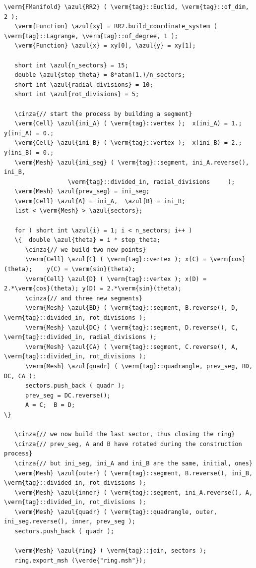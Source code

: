 \begin{Verbatim}[commandchars=\\\{\},formatcom=\small\tt,frame=single,
   label=parag-\ref{\numb section 9.\numb parag 2}.cpp,rulecolor=\color{coment},
   baselinestretch=0.94,framesep=2mm                                            ]
   \verm{FManifold} \azul{RR2} ( \verm{tag}::Euclid, \verm{tag}::of_dim, 2 );
   \verm{Function} \azul{xy} = RR2.build_coordinate_system ( \verm{tag}::Lagrange, \verm{tag}::of_degree, 1 );
   \verm{Function} \azul{x} = xy[0], \azul{y} = xy[1];

   short int \azul{n_sectors} = 15;
   double \azul{step_theta} = 8*atan(1.)/n_sectors;
   short int \azul{radial_divisions} = 10;
   short int \azul{rot_divisions} = 5;

   \cinza{// start the process by building a segment}
   \verm{Cell} \azul{ini_A} ( \verm{tag}::vertex );  x(ini_A) = 1.;  y(ini_A) = 0.;
   \verm{Cell} \azul{ini_B} ( \verm{tag}::vertex );  x(ini_B) = 2.;  y(ini_B) = 0.;
   \verm{Mesh} \azul{ini_seg} ( \verm{tag}::segment, ini_A.reverse(), ini_B,
                  \verm{tag}::divided_in, radial_divisions     );
   \verm{Mesh} \azul{prev_seg} = ini_seg;
   \verm{Cell} \azul{A} = ini_A,  \azul{B} = ini_B;
   list < \verm{Mesh} > \azul{sectors};

   for ( short int \azul{i} = 1; i < n_sectors; i++ )
   \{  double \azul{theta} = i * step_theta;
      \cinza{// we build two new points}
      \verm{Cell} \azul{C} ( \verm{tag}::vertex ); x(C) = \verm{cos}(theta);    y(C) = \verm{sin}(theta);
      \verm{Cell} \azul{D} ( \verm{tag}::vertex ); x(D) = 2.*\verm{cos}(theta); y(D) = 2.*\verm{sin}(theta);
      \cinza{// and three new segments}
      \verm{Mesh} \azul{BD} ( \verm{tag}::segment, B.reverse(), D, \verm{tag}::divided_in, rot_divisions );
      \verm{Mesh} \azul{DC} ( \verm{tag}::segment, D.reverse(), C, \verm{tag}::divided_in, radial_divisions );
      \verm{Mesh} \azul{CA} ( \verm{tag}::segment, C.reverse(), A, \verm{tag}::divided_in, rot_divisions );
      \verm{Mesh} \azul{quadr} ( \verm{tag}::quadrangle, prev_seg, BD, DC, CA );
      sectors.push_back ( quadr );
      prev_seg = DC.reverse();
      A = C;  B = D;                                                             \}

   \cinza{// we now build the last sector, thus closing the ring}
   \cinza{// prev_seg, A and B have rotated during the construction process}
   \cinza{// but ini_seg, ini_A and ini_B are the same, initial, ones}
   \verm{Mesh} \azul{outer} ( \verm{tag}::segment, B.reverse(), ini_B, \verm{tag}::divided_in, rot_divisions );
   \verm{Mesh} \azul{inner} ( \verm{tag}::segment, ini_A.reverse(), A, \verm{tag}::divided_in, rot_divisions );
   \verm{Mesh} \azul{quadr} ( \verm{tag}::quadrangle, outer, ini_seg.reverse(), inner, prev_seg );
   sectors.push_back ( quadr );
   
   \verm{Mesh} \azul{ring} ( \verm{tag}::join, sectors );
   ring.export_msh (\verde{"ring.msh"});
\end{Verbatim}

